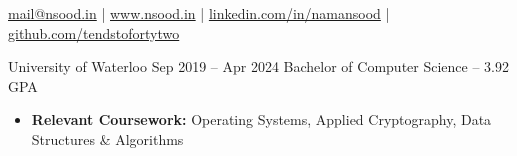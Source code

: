 \documentclass{article}
\begin{document}
    
\vspace{1mm}
{\hfill \href{mailto:mail@nsood.in}{mail@nsood.in} | 
        \href{https://www.nsood.in}{www.nsood.in} | 
        \href{https://linkedin.com/in/namansood}{linkedin.com/in/namansood} |
        \href{https://github.com/tendstofortytwo}{github.com/tendstofortytwo}
\hfill}

\EducationEntry
{University of Waterloo}
{Sep 2019 -- Apr 2024}
{Bachelor of Computer Science -- 3.92 GPA}
{\begin{itemize} \itemsep -1pt
    \item {\bf Relevant Coursework:} Operating Systems, Applied Cryptography, Data Structures \& Algorithms
    \end{itemize}}

\normalsize
{}
\vspace{1mm} %
\end{document}
